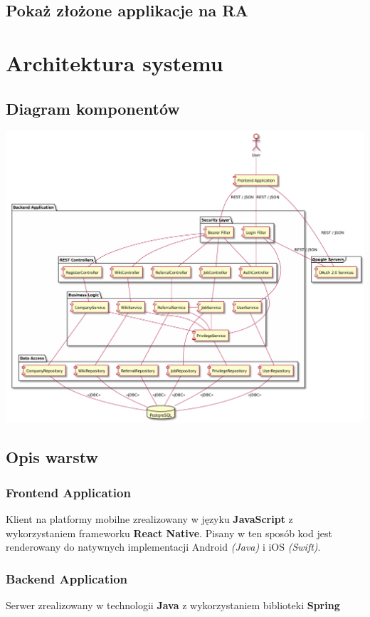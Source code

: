 \documentclass{scrreprt}
\begin{document}
\section{Pokaż złożone applikacje na RA}


\chapter{Architektura systemu}

\section{Diagram komponentów}
\includegraphics[width=\textwidth, keepaspectratio]{hydra_component_diagram.pdf}

\section{Opis warstw}
\subsection{Frontend Application}
Klient na platformy mobilne zrealizowany w języku \textbf{JavaScript} z wykorzystaniem frameworku \textbf{React Native}.
Pisany w ten sposób kod jest renderowany do natywnych implementacji Android \textit{(Java)} i iOS \textit{(Swift)}.

\subsection{Backend Application}
Serwer zrealizowany w technologii \textbf{Java} z wykorzystaniem biblioteki \textbf{Spring}
\end{document}
